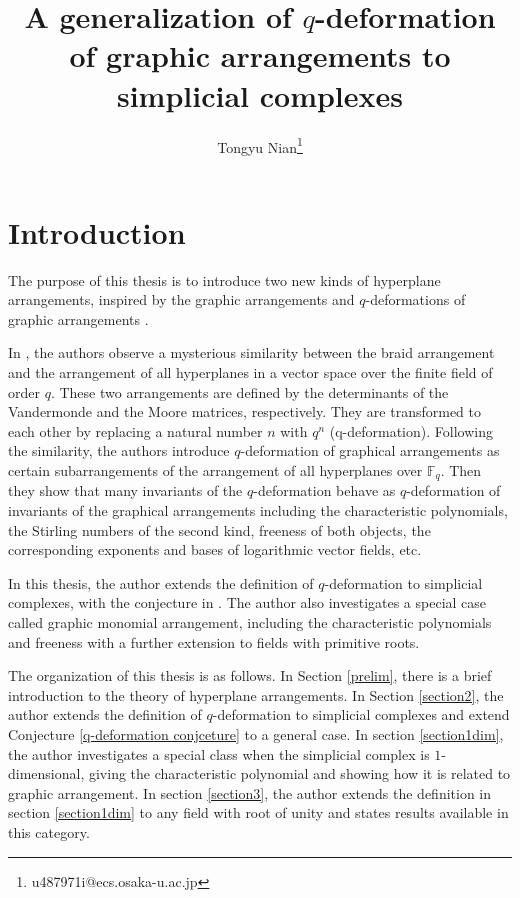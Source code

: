 \documentclass[12pt]{article}
\title{A generalization of $q$-deformation of graphic arrangements to simplicial complexes}
\author[1]{Tongyu Nian\thanks{u487971i@ecs.osaka-u.ac.jp}}
\affil[1]{Department of Mathematics, The University of Osaka, Toyonaka, Osaka 560-0043, Japan.}
\date{}
\theoremstyle{plain}%
\theoremstyle{definition}
\begin{document}
\maketitle

\section{Introduction}


The purpose of this thesis is to introduce two new kinds of hyperplane arrangements, inspired by the graphic arrangements and $q$-deformations of graphic arrangements \cite{nian2024qdeformationchromaticpolynomialsgraphical}. 

In \cite{nian2024qdeformationchromaticpolynomialsgraphical}, the authors observe a mysterious similarity between the braid arrangement and the arrangement of all hyperplanes in a vector space over the finite field of order $q$. These two arrangements are defined by the determinants of the Vandermonde and the Moore matrices, respectively. They are transformed to each other by replacing a natural number $n$ with $q^n$ (q-deformation). Following the similarity, the authors introduce $q$-deformation of graphical arrangements as certain subarrangements of the arrangement of all hyperplanes over $\mathbb{F}_q$. Then they show that many invariants of the $q$-deformation behave as $q$-deformation of invariants of the graphical arrangements including the characteristic polynomials, the Stirling numbers of the second kind, freeness of both objects, the corresponding exponents and bases of logarithmic vector fields, etc.

In this thesis, the author extends the definition of $q$-deformation to simplicial complexes, with the conjecture in \cite{nian2024qdeformationchromaticpolynomialsgraphical}. The author also investigates a special case called graphic monomial arrangement, including the characteristic polynomials and freeness with a further extension to fields with primitive roots.

The organization of this thesis is as follows. In Section \ref{prelim}, there is a brief introduction to the theory of hyperplane arrangements. In Section \ref{section2}, the author extends the definition of $q$-deformation to simplicial complexes and extend Conjecture \ref{q-deformation conjceture} to a general case. In section \ref{section1dim}, the author investigates a special class when the simplicial complex is $1$-dimensional, giving the characteristic polynomial and showing how it is related to graphic arrangement. In section \ref{section3}, the author extends the definition in section \ref{section1dim} to any field with root of unity and states results available in this category.
\end{document}
